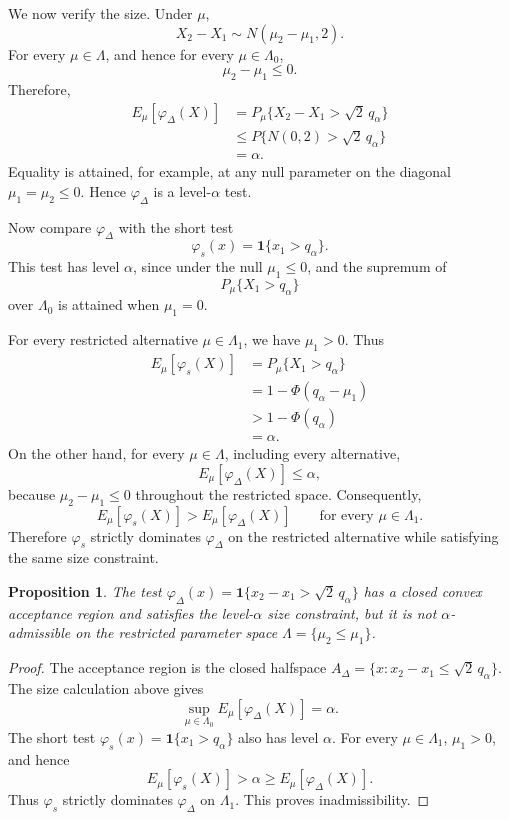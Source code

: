 \documentclass[11pt]{article}
\newtheorem{proposition}{Proposition}
\begin{document}
We now verify the size.  Under \(\mu\),
\[
  X_2-X_1 \sim N(\mu_2-
  \mu_1,2).
\]
For every \(\mu\in\Lambda\), and hence for every \(\mu\in\Lambda_0\),
\[
  \mu_2-\mu_1\le 0.
\]
Therefore,
\begin{align*}
  E_\mu[\varphi_\Delta(X)]
  &= P_\mu\{X_2-X_1>\sqrt{2}\,q_\alpha\} \\
  &\le P\{N(0,2)>\sqrt{2}\,q_\alpha\} \\
  &= \alpha.
\end{align*}
Equality is attained, for example, at any null parameter on the diagonal \(\mu_1=\mu_2\le 0\).  Hence \(\varphi_\Delta\) is a level-\(\alpha\) test.

Now compare \(\varphi_\Delta\) with the short test
\[
  \varphi_s(x)=\mathbf{1}\{x_1>q_\alpha\}.
\]
This test has level \(\alpha\), since under the null \(\mu_1\le 0\), and the supremum of
\[
  P_\mu\{X_1>q_\alpha\}
\]
over \(\Lambda_0\) is attained when \(\mu_1=0\).

For every restricted alternative \(\mu\in\Lambda_1\), we have \(\mu_1>0\).  Thus
\begin{align*}
  E_\mu[\varphi_s(X)]
  &= P_\mu\{X_1>q_\alpha\} \\
  &= 1-\Phi(q_\alpha-\mu_1) \\
  &> 1-\Phi(q_\alpha) \\
  &= \alpha.
\end{align*}
On the other hand, for every \(\mu\in\Lambda\), including every alternative,
\[
  E_\mu[\varphi_\Delta(X)]\le \alpha,
\]
because \(\mu_2-
\mu_1\le 0\) throughout the restricted space.  Consequently,
\[
  E_\mu[\varphi_s(X)] > E_\mu[\varphi_\Delta(X)]
  \qquad\text{for every }\mu\in\Lambda_1.
\]
Therefore \(\varphi_s\) strictly dominates \(\varphi_\Delta\) on the restricted alternative while satisfying the same size constraint.

\begin{proposition}
The test \(\varphi_\Delta(x)=\mathbf{1}\{x_2-x_1>\sqrt{2}\,q_\alpha\}\) has a closed convex acceptance region and satisfies the level-\(\alpha\) size constraint, but it is not \(\alpha\)-admissible on the restricted parameter space \(\Lambda=\{\mu_2\le \mu_1\}\).
\end{proposition}

\begin{proof}
The acceptance region is the closed halfspace \(A_\Delta=\{x:x_2-x_1\le \sqrt{2}\,q_\alpha\}\).  The size calculation above gives
\[
  \sup_{\mu\in\Lambda_0}E_\mu[\varphi_\Delta(X)]=\alpha.
\]
The short test \(\varphi_s(x)=\mathbf{1}\{x_1>q_\alpha\}\) also has level \(\alpha\).  For every \(\mu\in\Lambda_1\), \(\mu_1>0\), and hence
\[
  E_\mu[\varphi_s(X)]>\alpha\ge E_\mu[\varphi_\Delta(X)].
\]
Thus \(\varphi_s\) strictly dominates \(\varphi_\Delta\) on \(\Lambda_1\).  This proves inadmissibility.
\end{proof}
\end{document}
